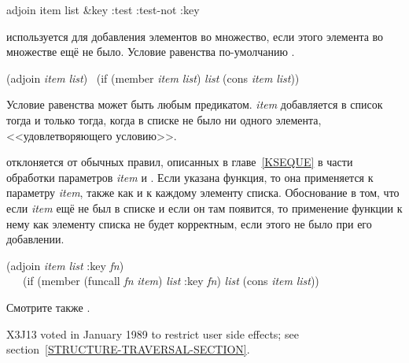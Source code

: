 \begin{defun}[Функция]
adjoin item list &key :test :test-not :key

 используется для добавления элементов во множество, если этого
элемента во множестве ещё не было. Условие равенства по-умолчанию .
\begin{lisp}
(adjoin \emph{item} \emph{list}) \EQ\ (if (member \emph{item} \emph{list}) \emph{list} (cons \emph{item} \emph{list}))
\end{lisp}
Условие равенства может быть любым предикатом. \emph{item} добавляется в список
тогда и только тогда, когда в списке не было ни одного элемента,
<<удовлетворяющего условию>>.

 отклоняется от обычных правил, описанных в главе~\ref{KSEQUE} в
части обработки параметров \emph{item} и .
Если указана  функция, то она применяется к параметру \emph{item}, также
как и к каждому элементу списка. Обоснование в том, что если \emph{item} ещё не
был в списке и если он там появится, то применение функции  к нему как
элементу списка не будет корректным, если этого не было при его добавлении.
\begin{lisp}
(adjoin \emph{item} \emph{list} :key \emph{fn}) \\
~~\EQ\ (if (member (funcall \emph{fn} \emph{item}) \emph{list}
  :key \emph{fn}) \emph{list} (cons \emph{item} \emph{list})) 
\end{lisp}

Смотрите также .

\begin{new}
X3J13 voted in January 1989
to restrict user side effects; see section~\ref{STRUCTURE-TRAVERSAL-SECTION}.
\end{new}
\end{defun}

